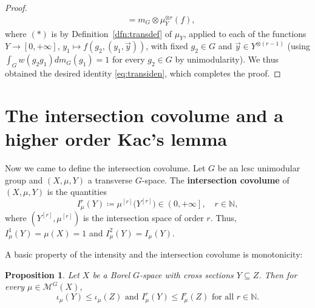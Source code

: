 \documentclass{amsart}
\numberwithin{equation}{subsection}
\newtheorem{prop}[thm]{Proposition}
\theoremstyle{remark}
\begin{document}
\begin{proof}
\begin{align*}
&=m_{G}\otimes\mu_{Y}^{\otimes r}\left(f\right),
\end{align*}
where \(\left(\ast\right)\) is by Definition~\ref{dfn:transdef} of \(\mu_{Y}\), applied to each of the functions \(Y\to\left[0,+\infty\right]\), \(y_{1}\mapsto f\left(g_{2},\left(y_{1},\vec{y}\right)\right)\), with fixed \(g_{2}\in G\) and \(\vec{y}\in Y^{\otimes\left(r-1\right)}\) (using \(\int_{G}w\left(g_{2}g_{1}\right)dm_{G}\left(g_{1}\right)=1\) for every \(g_{2}\in G\) by unimodularity). We thus obtained the desired identity \eqref{eq:transiden}, which completes the proof.
\end{proof}

\section{The intersection covolume and a higher order Kac's lemma}\label{sct:intvol}

Now we came to define the intersection covolume. Let \(G\) be an lcsc unimodular group and \(\left(X,\mu,Y\right)\) a transverse \(G\)-space. The {\bf intersection covolume} of \(\left(X,\mu,Y\right)\) is the quantities
\[I_{\mu}^{r}\left(Y\right)\coloneqq \mu^{\left[r\right]}\big(Y^{\left[r\right]}\big)\in\left(0,+\infty\right],\quad r\in\mathbb{N},\]
where \(\left(Y^{\left[r\right]},\mu^{\left[r\right]}\right)\) is the intersection space of order \(r\). Thus, \(I_{\mu}^{1}\left(Y\right)=\mu\left(X\right)=1\) and \(I_{\mu}^{2}\left(Y\right)=I_{\mu}\left(Y\right)\).

\smallskip

A basic property of the intensity and the intersection covolume is monotonicity:

\begin{prop}\label{prop:mono}
Let \(X\) be a Borel \(G\)-space with cross sections \(Y\subseteq Z\). Then for every \(\mu\in\mathcal{M}^{G}\left(X\right)\),
\[\iota_{\mu}\left(Y\right)\leq\iota_{\mu}\left(Z\right)\text{ and }I_{\mu}^{r}\left(Y\right)\leq I_{\mu}^{r}\left(Z\right)\text{ for all }r\in\mathbb{N}.\]
\end{prop}
\end{document}
